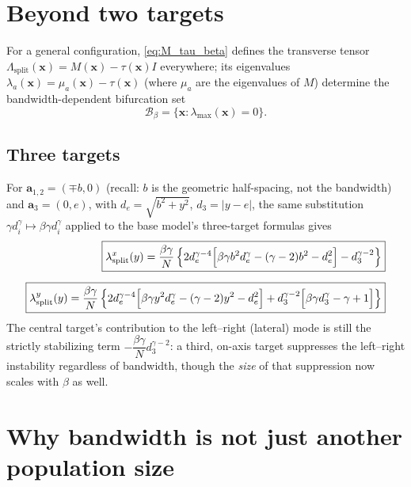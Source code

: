 \documentclass[11pt,a4paper]{article}
\theoremstyle{plain}
\theoremstyle{definition}
\theoremstyle{remark}
\newcommand{\bx}{\bm{x}}
\newcommand{\ba}{\bm{a}}
\newcommand{\Lsplit}{\Lambda_{\mathrm{split}}}
\newcommand{\bw}{\beta}
\begin{document}
\section{Beyond two targets}
\label{sec:general_geometry}

For a general configuration, \eqref{eq:M_tau_beta} defines the transverse
tensor $\Lsplit(\bx)=M(\bx)-\tau(\bx)I$ everywhere; its eigenvalues
$\lambda_a(\bx)=\mu_a(\bx)-\tau(\bx)$ (where $\mu_a$ are the eigenvalues of
$M$) determine the bandwidth-dependent bifurcation set
\begin{equation}
  \boxed{
  \mathcal B_{\bw}=\{\bx:\lambda_{\max}(\bx)=0\}.
  }
  \label{eq:bifurcation_set}
\end{equation}

\subsection{Three targets}
\label{sec:three}

For $\ba_{1,2}=(\mp b,0)$ (recall: $b$ is the geometric half-spacing, not the
bandwidth) and $\ba_3=(0,e)$, with $d_e=\sqrt{b^2+y^2}$, $d_3=|y-e|$, the
same substitution $\gamma d_i^\gamma\mapsto\bw\gamma d_i^\gamma$ applied to
the base model's three-target formulas gives
\begin{align}
  \boxed{
  \lambda^x_{\rm split}(y)
  =
  \frac{\bw\gamma}{N}
  \left\{
  2d_e^{\gamma-4}\Big[\bw\gamma b^2 d_e^{\gamma}-(\gamma-2)b^2-d_e^2\Big]
  -
  d_3^{\gamma-2}
  \right\}
  }
  \label{eq:three_x_beta}\\[6pt]
  \boxed{
  \lambda^y_{\rm split}(y)
  =
  \frac{\bw\gamma}{N}
  \left\{
  2d_e^{\gamma-4}\Big[\bw\gamma y^2 d_e^{\gamma}-(\gamma-2)y^2-d_e^2\Big]
  +
  d_3^{\gamma-2}\Big[\bw\gamma d_3^{\gamma}-\gamma+1\Big]
  \right\}
  }
  \label{eq:three_y_beta}
\end{align}
The central target's contribution to the left--right (lateral) mode is still
the strictly stabilizing term $-\dfrac{\bw\gamma}{N}d_3^{\gamma-2}$: a
third, on-axis target suppresses the left--right instability regardless of
bandwidth, though the \emph{size} of that suppression now scales with
$\bw$ as well.

\section{Why bandwidth is not just another population size}
\label{sec:beta_vs_N}
\end{document}
